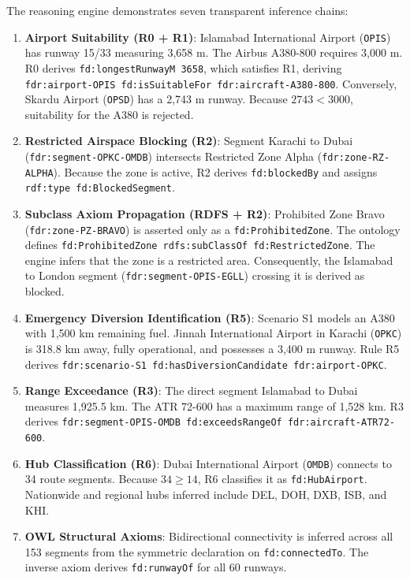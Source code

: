 \documentclass[conference]{IEEEtran}
\begin{document}
The reasoning engine demonstrates seven transparent inference chains:
\begin{enumerate}
    \item \textbf{Airport Suitability (R0 + R1)}: Islamabad International Airport (\texttt{OPIS}) has runway 15/33 measuring 3,658 m. The Airbus A380-800 requires 3,000 m. R0 derives \texttt{fd:longestRunwayM 3658}, which satisfies R1, deriving \texttt{fdr:airport-OPIS fd:isSuitableFor fdr:aircraft-A380-800}. Conversely, Skardu Airport (\texttt{OPSD}) has a 2,743 m runway. Because $2743 < 3000$, suitability for the A380 is rejected.
    \item \textbf{Restricted Airspace Blocking (R2)}: Segment Karachi to Dubai (\texttt{fdr:segment-OPKC-OMDB}) intersects Restricted Zone Alpha (\texttt{fdr:zone-RZ-ALPHA}). Because the zone is active, R2 derives \texttt{fd:blockedBy} and assigns \texttt{rdf:type fd:BlockedSegment}.
    \item \textbf{Subclass Axiom Propagation (RDFS + R2)}: Prohibited Zone Bravo (\texttt{fdr:zone-PZ-BRAVO}) is asserted only as a \texttt{fd:ProhibitedZone}. The ontology defines \texttt{fd:ProhibitedZone rdfs:subClassOf fd:RestrictedZone}. The engine infers that the zone is a restricted area. Consequently, the Islamabad to London segment (\texttt{fdr:segment-OPIS-EGLL}) crossing it is derived as blocked.
    \item \textbf{Emergency Diversion Identification (R5)}: Scenario S1 models an A380 with 1,500 km remaining fuel. Jinnah International Airport in Karachi (\texttt{OPKC}) is 318.8 km away, fully operational, and possesses a 3,400 m runway. Rule R5 derives \texttt{fdr:scenario-S1 fd:hasDiversionCandidate fdr:airport-OPKC}.
    \item \textbf{Range Exceedance (R3)}: The direct segment Islamabad to Dubai measures 1,925.5 km. The ATR 72-600 has a maximum range of 1,528 km. R3 derives \texttt{fdr:segment-OPIS-OMDB fd:exceedsRangeOf fdr:aircraft-ATR72-600}.
    \item \textbf{Hub Classification (R6)}: Dubai International Airport (\texttt{OMDB}) connects to 34 route segments. Because $34 \ge 14$, R6 classifies it as \texttt{fd:HubAirport}. Nationwide and regional hubs inferred include DEL, DOH, DXB, ISB, and KHI.
    \item \textbf{OWL Structural Axioms}: Bidirectional connectivity is inferred across all 153 segments from the symmetric declaration on \texttt{fd:connectedTo}. The inverse axiom derives \texttt{fd:runwayOf} for all 60 runways.
\end{enumerate}
\end{document}
